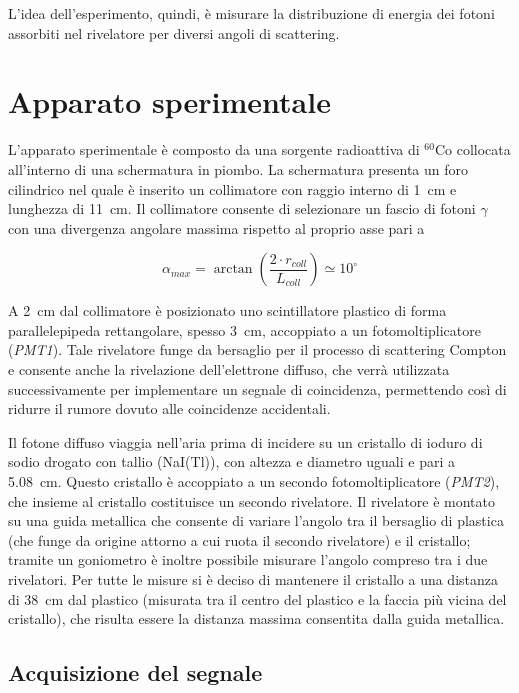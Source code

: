 \documentclass[10pt,twocolumn]{article}
\begin{document}
L'idea dell'esperimento, quindi, è misurare la distribuzione di energia dei fotoni assorbiti nel rivelatore per diversi angoli di scattering.


\section{Apparato sperimentale}
\label{sec:apparatus}

L'apparato sperimentale è composto da una sorgente radioattiva di $^{60}$Co collocata all'interno di una schermatura in piombo. La schermatura presenta un foro cilindrico nel quale è inserito un collimatore con raggio interno di \SI{1}{cm} e lunghezza di \SI{11}{cm}. Il collimatore consente di selezionare un fascio di fotoni $\gamma$ con una divergenza angolare massima rispetto al proprio asse pari a

\begin{equation}
\alpha_{max} = \arctan\left(\frac{2\cdot r_{coll}}{L_{coll}}\right)\simeq 10^\circ
\label{eq:div_coll}
\end{equation}

A \SI{2}{cm} dal collimatore è posizionato uno scintillatore plastico di forma parallelepipeda rettangolare, spesso \SI{3}{cm}, accoppiato a un fotomoltiplicatore (\textit{PMT1}). Tale rivelatore funge da bersaglio per il processo di scattering Compton e consente anche la rivelazione dell'elettrone diffuso, che verrà utilizzata successivamente per implementare un segnale di coincidenza, permettendo così di ridurre il rumore dovuto alle coincidenze accidentali. 

Il fotone diffuso viaggia nell'aria prima di incidere su un cristallo di ioduro di sodio drogato con tallio (NaI(Tl)), con altezza e diametro uguali e pari a \SI{5.08}{cm}. Questo cristallo è accoppiato a un secondo fotomoltiplicatore (\textit{PMT2}), che insieme al cristallo costituisce un secondo rivelatore. Il rivelatore è montato su una guida metallica che consente di variare l'angolo tra il bersaglio di plastica (che funge da origine attorno a cui ruota il secondo rivelatore) e il cristallo; tramite un goniometro è inoltre possibile misurare l'angolo compreso tra i due rivelatori. Per tutte le misure si è deciso di mantenere il cristallo a una distanza di \SI{38}{cm} dal plastico (misurata tra il centro del plastico e la faccia più vicina del cristallo), che risulta essere la distanza massima consentita dalla guida metallica.

\subsection{Acquisizione del segnale}
\label{subsec:as}
\end{document}
